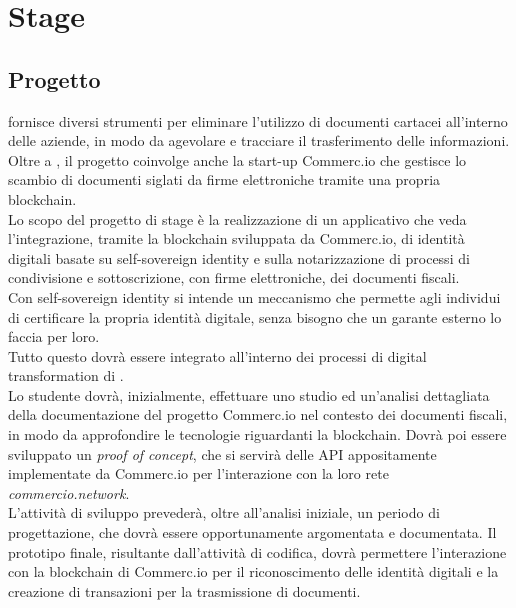 
\chapter{Stage}
\label{cap:processi-metodologie}


\section{Progetto}

\myCompany{} \companyTitle{} fornisce diversi strumenti per eliminare l'utilizzo di documenti cartacei all’interno delle aziende, in modo da agevolare e tracciare il trasferimento delle informazioni. Oltre a \myCompany{} \companyTitle, il progetto coinvolge anche la start-up Commerc.io che gestisce lo scambio di documenti siglati da firme elettroniche tramite una propria blockchain.
\\
Lo scopo del progetto di stage è la realizzazione di un applicativo che veda l'integrazione, tramite la blockchain sviluppata da Commerc.io, di identità digitali basate su self-sovereign identity e sulla notarizzazione di processi di condivisione e sottoscrizione, con firme elettroniche, dei documenti fiscali.
\\
Con self-sovereign identity si intende un meccanismo che permette agli individui di certificare la propria identità digitale, senza bisogno che un garante esterno lo faccia per loro.
\\
Tutto questo dovrà essere integrato all'interno dei processi di digital transformation di \myCompany{} \companyTitle.
\\
Lo studente dovrà, inizialmente, effettuare uno studio ed un'analisi dettagliata della documentazione del progetto Commerc.io nel contesto dei documenti fiscali, in modo da approfondire le tecnologie riguardanti la blockchain. Dovrà poi essere sviluppato un \textit{proof of concept}, che si servirà delle API appositamente implementate da Commerc.io per l'interazione con la loro rete \textit{commercio.network}.
\\
L'attività di sviluppo prevederà, oltre all'analisi iniziale, un periodo di progettazione, che dovrà essere opportunamente argomentata e documentata. Il prototipo finale, risultante dall'attività di codifica, dovrà permettere l'interazione con la blockchain di Commerc.io per il riconoscimento delle identità digitali e la creazione di transazioni per la trasmissione di documenti.
